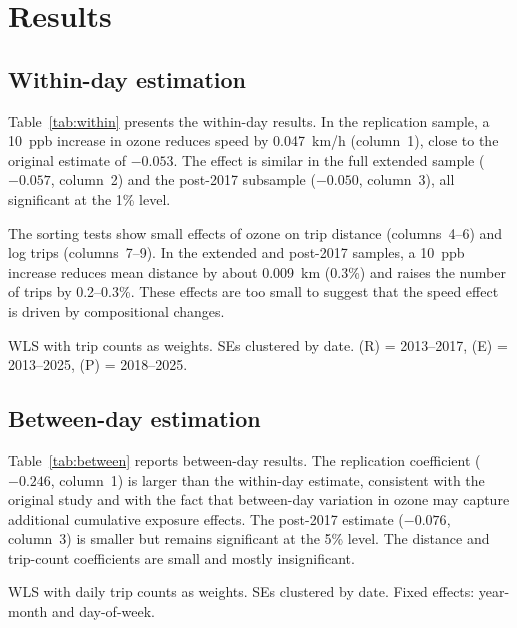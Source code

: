 \documentclass[12pt]{article}
\begin{document}
\section{Results} \label{sec:results}

\subsection{Within-day estimation}

Table~\ref{tab:within} presents the within-day results. In the replication sample, a 10~ppb increase in ozone reduces speed by 0.047~km/h (column~1), close to the original estimate of $-0.053$. The effect is similar in the full extended sample ($-0.057$, column~2) and the post-2017 subsample ($-0.050$, column~3), all significant at the 1\% level.

The sorting tests show small effects of ozone on trip distance (columns~4--6) and log trips (columns~7--9). In the extended and post-2017 samples, a 10~ppb increase reduces mean distance by about 0.009~km (0.3\%) and raises the number of trips by 0.2--0.3\%. These effects are too small to suggest that the speed effect is driven by compositional changes.

\begin{table}[H]
\centering
\caption{Within-day estimation.}
\label{tab:within}


\medskip
\footnotesize WLS with trip counts as weights. SEs clustered by date. (R) = 2013--2017, (E) = 2013--2025, (P) = 2018--2025.
\end{table}


\subsection{Between-day estimation}

Table~\ref{tab:between} reports between-day results. The replication coefficient ($-0.246$, column~1) is larger than the within-day estimate, consistent with the original study and with the fact that between-day variation in ozone may capture additional cumulative exposure effects. The post-2017 estimate ($-0.076$, column~3) is smaller but remains significant at the 5\% level. The distance and trip-count coefficients are small and mostly insignificant.

\begin{table}[H]
\centering
\caption{Between-day estimation.}
\label{tab:between}


\medskip
\footnotesize WLS with daily trip counts as weights. SEs clustered by date. Fixed effects: year-month and day-of-week.
\end{table}
\end{document}
